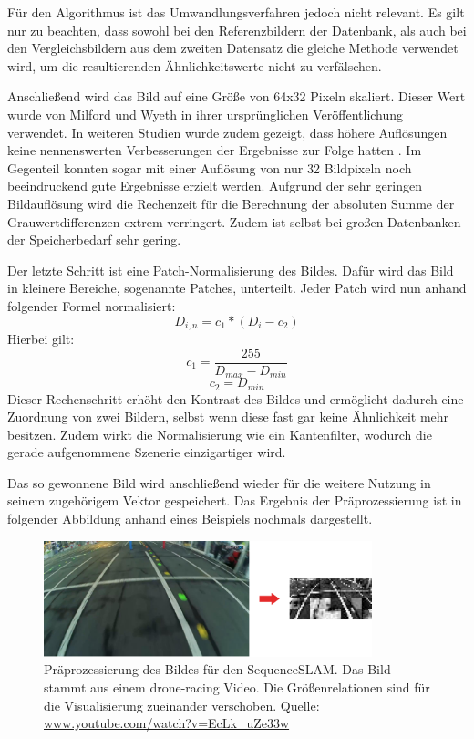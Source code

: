 \documentclass[12pt,a4paper,titlepage]{scrartcl}
\begin{document}
Für den Algorithmus ist das Umwandlungsverfahren jedoch nicht relevant. Es gilt nur zu beachten, dass sowohl bei den Referenzbildern der Datenbank, als auch bei den Vergleichsbildern aus dem zweiten Datensatz die gleiche Methode verwendet wird, um die resultierenden Ähnlichkeitswerte nicht zu verfälschen.

Anschließend wird das Bild auf eine Größe von 64x32 Pixeln skaliert. Dieser Wert wurde von Milford und Wyeth in ihrer ursprünglichen Veröffentlichung verwendet. In weiteren Studien wurde zudem gezeigt, dass höhere Auflösungen keine nennenswerten Verbesserungen der Ergebnisse zur Folge hatten \cite{milford2013vision}. Im Gegenteil konnten sogar mit einer Auflösung von nur 32 Bildpixeln noch beeindruckend gute Ergebnisse erzielt werden. Aufgrund der sehr geringen Bildauflösung wird die Rechenzeit für die Berechnung der absoluten Summe der Grauwertdifferenzen extrem verringert. Zudem ist selbst bei großen Datenbanken der Speicherbedarf sehr gering.

Der letzte Schritt ist eine Patch-Normalisierung des Bildes. Dafür wird das Bild in kleinere Bereiche, sogenannte Patches, unterteilt. Jeder Patch wird nun anhand folgender Formel normalisiert: 
\begin{equation}
D_{i,n}=c_1*(D_i-c_2)
\end{equation}
Hierbei gilt: 
\begin{equation*}
c_1=\frac{255}{D_{max}-D_{min}}
\end{equation*}
\begin{equation*}
c_2=D_{min}
\end{equation*}
Dieser Rechenschritt erhöht den Kontrast des Bildes und ermöglicht dadurch eine Zuordnung von zwei Bildern, selbst wenn diese fast gar keine Ähnlichkeit mehr besitzen. Zudem wirkt die Normalisierung wie ein Kantenfilter, wodurch die gerade aufgenommene Szenerie einzigartiger wird.

Das so gewonnene Bild wird anschließend wieder für die weitere Nutzung in seinem zugehörigem Vektor gespeichert. Das Ergebnis der Präprozessierung ist in folgender Abbildung anhand eines Beispiels nochmals dargestellt.
\begin{figure}[h.t]
	\centering
	\includegraphics[width=0.85\textwidth]{../Bilder/Preprocessing_result.pdf}
	\caption[Präprozessierung des Bildes]{Präprozessierung des Bildes für den SequenceSLAM. Das Bild stammt aus einem drone-racing Video. Die Größenrelationen sind für die Visualisierung zueinander verschoben. Quelle: \url{www.youtube.com/watch?v=EcLk_uZe33w} }
	\label{img:Prepro}
\end{figure}
\end{document}
